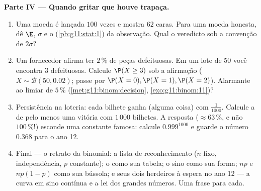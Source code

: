 \begin{problem}
\medskip
\noindent\textbf{Parte IV --- Quando gritar que houve trapaça.}
\begin{enumerate}[resume]
  \item Uma moeda é lançada $100$ vezes e mostra $62$ caras. Para
        uma moeda honesta, dê $\E$, $\sigma$ e o 
        (\cref{pb:g11:stat:1}) da observação. Qual o veredicto
        sob a convenção de $2\sigma$?
  \item Um fornecedor afirma ter $2\,\%$ de peças defeituosas. Em
        um lote de $50$ você encontra $3$ defeituosas. Calcule
        $\P(X \geq 3)$ sob a afirmação
        ($X \sim \mathcal B(50, 0.02)$; passe por
        $\P(X = 0), \P(X = 1), \P(X = 2)$). Alarmante ao limiar
        de $5\,\%$ (\cref{met:g11:binom:decision},
        \cref{exo:g11:binom:11})?
  \item Persistência na loteria: cada bilhete ganha (alguma
        coisa) com  $\frac{1}{1000}$. Calcule a
         de pelo menos uma vitória com $1\,000$
        bilhetes. A resposta ($\approx 63\,\%$, e não
        $100\,\%$!) esconde uma constante famosa: calcule
        $0.999^{1000}$ e guarde o número $0.368$ para o ano 12.
  \item Final --- o retrato da binomial: a lista de
        reconhecimento ($n$ fixo, independência, $p$ constante);
        o  como sua tabela; o sino como sua
        forma; $np$ e $np(1-p)$ como sua bússola; e seus dois
        herdeiros à espera no ano 12 --- a curva em sino contínua
        e a lei dos grandes números. Uma frase para cada.
\end{enumerate}
\end{problem}
